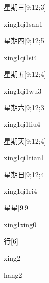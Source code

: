 \begin{verbete}{星期三}[9;12;3]
\begin{pronuncia}{xing1qi1san1}
\end{pronuncia}
\end{verbete}

\begin{verbete}[xing1qi1si4]{星期四}[9;12;5]
\begin{pronuncia}{xing1qi1si4}
\end{pronuncia}
\end{verbete}

\begin{verbete}[xing1qi1wu3]{星期五}[9;12;4]
\begin{pronuncia}{xing1qi1wu3}
\end{pronuncia}
\end{verbete}

\begin{verbete}{星期六}[9;12;3]
\begin{pronuncia}{xing1qi1liu4}
\end{pronuncia}
\end{verbete}

\begin{verbete}{星期天}[9;12;4]
\begin{pronuncia}{xing1qi1tian1}
\end{pronuncia}
\end{verbete}

\begin{verbete}[xing1qi1ri4]{星期日}[9;12;4]
\begin{pronuncia}{xing1qi1ri4}
\end{pronuncia}
\end{verbete}

\begin{verbete}{星星}[9;9]
\begin{pronuncia}{xing1xing0}
\end{pronuncia}
\end{verbete}

\begin{verbete}[xing2]{行}[6]
\begin{pronuncia}{xing2}
\end{pronuncia}
\begin{pronuncia}{hang2}
\end{pronuncia}
\end{verbete}

